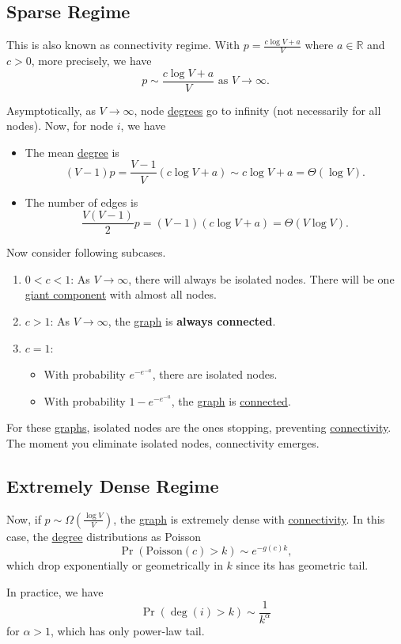 \subsection{Sparse Regime}\label{subsec:sparse-regime}
This is also known as connectivity regime. With \(p = \frac{c\log V + a}{V}\) where \(a\in\mathbb{R}\) and \(c>0\), more precisely, we have
\[
	p\sim \frac{c\log V + a}{V} \text{ as }V\to \infty.
\]

Asymptotically, as \(V\to \infty \), node \hyperref[def:degree]{degrees} go to infinity (not necessarily for all nodes). Now, for node \(i\), we have
\begin{itemize}
	\item The mean \hyperref[def:degree]{degree} is
	      \[
		      (V - 1)p = \frac{V-1}{V}(c\log V + a)\sim c\log V + a = \Theta(\log V).
	      \]
	\item The number of edges is
	      \[
		      \frac{V(V-1)}{2}p = (V - 1)(c\log V + a) = \Theta(V\log V).
	      \]
\end{itemize}

\begin{remark}
	Now consider following subcases.
	\begin{enumerate}
		\item \(0<c<1\): As \(V\to \infty \), there will always be isolated nodes. There will be one \hyperref[def:giant-component]{giant component} with almost all nodes.
		\item \(c>1\): As \(V\to \infty \), the \hyperref[def:graph]{graph} is \textbf{always connected}.
		\item \(c = 1\):
		      \begin{itemize}
			      \item With probability \(e^{-e^{-a}}\), there are isolated nodes.
			      \item With probability \(1 - e^{-e^{-a}}\), the \hyperref[def:graph]{graph} is \hyperref[def:connected]{connected}.
		      \end{itemize}
	\end{enumerate}
	For these \hyperref[def:graph]{graphs}, isolated nodes are the ones stopping, preventing \hyperref[def:connected]{connectivity}. The moment you eliminate isolated nodes, connectivity emerges.
\end{remark}

\subsection{Extremely Dense Regime}\label{subsec:extremely-dense-regime}
Now, if \(p\sim \Omega(\frac{\log V}{V})\), the \hyperref[def:graph]{graph} is extremely dense with \hyperref[def:connected]{connectivity}. In this case, the \hyperref[def:degree]{degree} distributions as Poisson
\[
	\Pr(\mathrm{Poisson}(c) > k) \sim e^{-g(c)k},
\]
which drop exponentially or geometrically in \(k\) since its has geometric tail.
\begin{remark}
	In practice, we have
	\[
		\Pr(\deg(i) > k) \sim \frac{1}{k^\alpha }
	\]
	for \(\alpha > 1\), which has only power-law tail.
\end{remark}